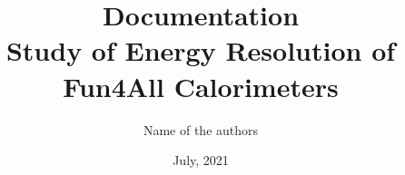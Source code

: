\title{\large Documentation\\[0.5cm]
        \bf\Large Study of Energy Resolution of Fun4All Calorimeters }
\author{\large Name of the authors}
\date{July, 2021}
\makeatletter
    \begin{titlepage}
        \begin{center}
        \vbox{}\vspace{5cm}
            {\@title }\\[3cm] 
            {\@author}\\
            {\@date}
        \end{center}
    \end{titlepage}
\makeatother
